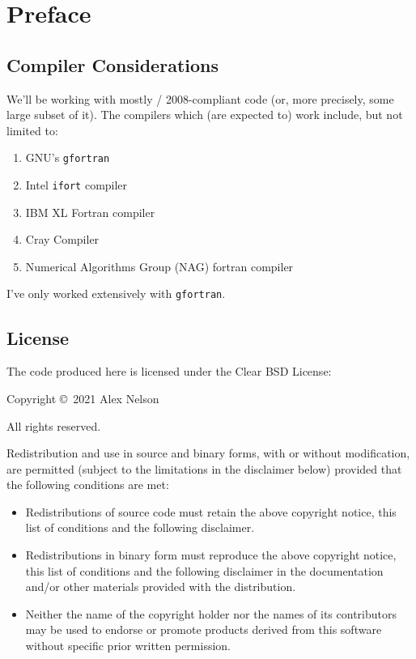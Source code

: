 \chapter*{Preface}

\section*{Compiler Considerations}

We'll be working with mostly \FORTRAN/ 2008-compliant code (or, more
precisely, some large subset of it). The compilers which (are expected
to) work include, but not limited to:
\begin{enumerate}
\item GNU's {\tt gfortran}
\item Intel {\tt ifort} compiler
\item IBM XL Fortran compiler
\item Cray Compiler
\item Numerical Algorithms Group (NAG) fortran compiler
\end{enumerate}
I've only worked extensively with {\tt gfortran}.

\section*{License}

The code produced here is licensed under the Clear BSD License:

\bigskip

Copyright \copyright\ 2021 Alex Nelson

All rights reserved.

Redistribution and use in source and binary forms, with or without
modification, are permitted (subject to the limitations in the
disclaimer below) provided that the following conditions are met:

\begin{itemize}
\item Redistributions of source code must retain the above copyright
     notice, this list of conditions and the following disclaimer.
\item Redistributions in binary form must reproduce the above copyright
     notice, this list of conditions and the following disclaimer in the
     documentation and/or other materials provided with the
     distribution.
\item Neither the name of the copyright holder nor the names of its
     contributors may be used to endorse or promote products derived
     from this software without specific prior written permission.
\end{itemize}

